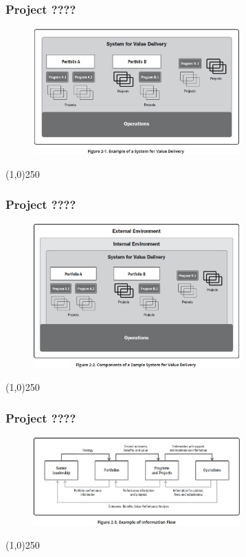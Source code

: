 \begin{frame}
\frametitle{Project ????}
 \begin{figure}
    \centering
        \includegraphics[width = 8cm]{../images/standard/Fig2-1.jpg}
    \label{standardfig:2-1}
 \end{figure}
\end{frame}
\begin{center}\line(1,0){250}\end{center}


\begin{frame}
\frametitle{Project ????}
 \begin{figure}
    \centering
        \includegraphics[width = 8cm]{../images/standard/Fig2-2.jpg}
    \label{standardfig:2-2}
 \end{figure}
\end{frame}
\begin{center}\line(1,0){250}\end{center}

\begin{frame}
\frametitle{Project ????}
 \begin{figure}
    \centering
        \includegraphics[width = 8cm]{../images/standard/Fig2-3.jpg}
    \label{standardfig:2-3}
 \end{figure}
\end{frame}
\begin{center}\line(1,0){250}\end{center}

